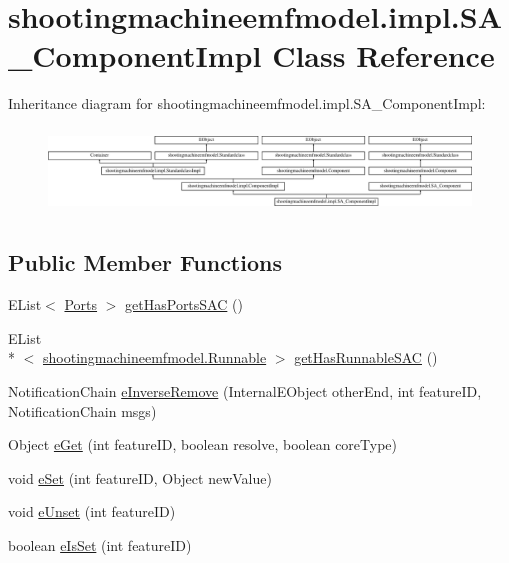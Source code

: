 \hypertarget{classshootingmachineemfmodel_1_1impl_1_1_s_a___component_impl}{\section{shootingmachineemfmodel.\-impl.\-S\-A\-\_\-\-Component\-Impl Class Reference}
\label{classshootingmachineemfmodel_1_1impl_1_1_s_a___component_impl}
}
Inheritance diagram for shootingmachineemfmodel.\-impl.\-S\-A\-\_\-\-Component\-Impl\-:\begin{figure}[H]
\begin{center}
\leavevmode
\includegraphics[height=2.287582cm]{classshootingmachineemfmodel_1_1impl_1_1_s_a___component_impl}
\end{center}
\end{figure}
\subsection*{Public Member Functions}
\begin{DoxyCompactItemize}
\item 
E\-List$<$ \hyperlink{interfaceshootingmachineemfmodel_1_1_ports}{Ports} $>$ \hyperlink{classshootingmachineemfmodel_1_1impl_1_1_s_a___component_impl_a33cf8cec28514b7843445dc395c5b072}{get\-Has\-Ports\-S\-A\-C} ()
\item 
E\-List\\*
$<$ \hyperlink{interfaceshootingmachineemfmodel_1_1_runnable}{shootingmachineemfmodel.\-Runnable} $>$ \hyperlink{classshootingmachineemfmodel_1_1impl_1_1_s_a___component_impl_a4e201e8a6ffc5a7434539c6b2d36e1e4}{get\-Has\-Runnable\-S\-A\-C} ()
\item 
Notification\-Chain \hyperlink{classshootingmachineemfmodel_1_1impl_1_1_s_a___component_impl_a20ba3fa4c8c88246ee9e45c29e970722}{e\-Inverse\-Remove} (Internal\-E\-Object other\-End, int feature\-I\-D, Notification\-Chain msgs)
\item 
Object \hyperlink{classshootingmachineemfmodel_1_1impl_1_1_s_a___component_impl_afffc9552bf498c0e7a4afd8adc533a91}{e\-Get} (int feature\-I\-D, boolean resolve, boolean core\-Type)
\item 
void \hyperlink{classshootingmachineemfmodel_1_1impl_1_1_s_a___component_impl_a751c85f5c86826ae00cbc5a9557c49be}{e\-Set} (int feature\-I\-D, Object new\-Value)
\item 
void \hyperlink{classshootingmachineemfmodel_1_1impl_1_1_s_a___component_impl_ab680a945ec5b2eb5fe104b9275104ae9}{e\-Unset} (int feature\-I\-D)
\item 
boolean \hyperlink{classshootingmachineemfmodel_1_1impl_1_1_s_a___component_impl_a5fc50cb1c235f29707ab774fe8e0b3a1}{e\-Is\-Set} (int feature\-I\-D)
\end{DoxyCompactItemize}
